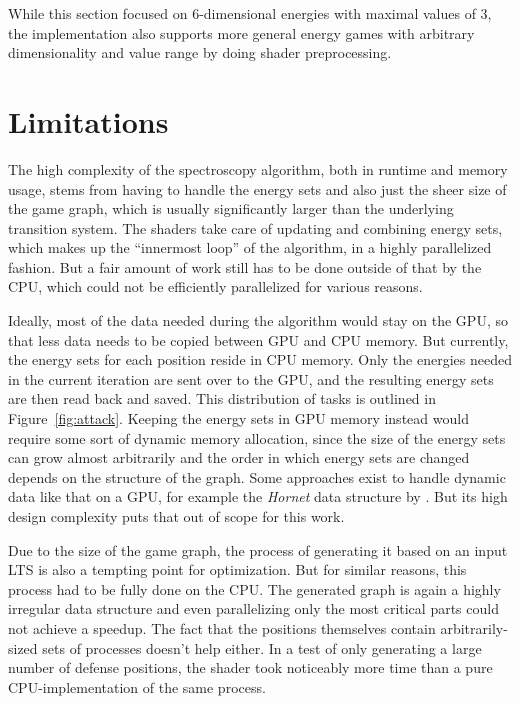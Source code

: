 While this section focused on 6-dimensional energies with maximal values of 3,
the implementation also supports more general energy games with arbitrary
dimensionality and value range by doing shader preprocessing.


\section{Limitations}

The high complexity of the spectroscopy algorithm,
both in runtime and memory usage,
stems from having to handle the energy sets
and also just the sheer size of the game graph,
which is usually significantly larger than the underlying transition system.
The shaders take care of updating and combining energy sets,
which makes up the \enquote{innermost loop} of the algorithm,
in a highly parallelized fashion. 
But a fair amount of work still has to be done
outside of that by the CPU,
which could not be efficiently parallelized for various reasons.

Ideally, most of the data needed during the algorithm would stay on the GPU,
so that less data needs to be copied between GPU and CPU memory.
But currently, the energy sets for each position reside in CPU memory.
Only the energies needed in the current iteration are sent over to the GPU,
and the resulting energy sets are then read back and saved.
This distribution of tasks is outlined in Figure~\ref{fig:attack}.
Keeping the energy sets in GPU memory instead would require some sort of
dynamic memory allocation,
since the size of the energy sets can grow almost arbitrarily
and the order in which energy sets are changed depends on the structure of the
graph.
Some approaches exist to handle dynamic data like that on a GPU,
for example the \emph{Hornet} data structure by \textcite{Busato2018}.
But its high design complexity puts that out of scope for this work.

Due to the size of the game graph, the process of generating it based on an
input LTS is also a tempting point for optimization.
But for similar reasons, this process had to be fully done on the CPU\@.
The generated graph is again a highly irregular data structure and
even parallelizing only the most critical parts could not achieve a speedup.
The fact that the positions themselves contain arbitrarily-sized sets of
processes doesn't help either.
In a test of only generating a large number of defense positions,
the shader took noticeably more time than a pure CPU-implementation of the same
process.

